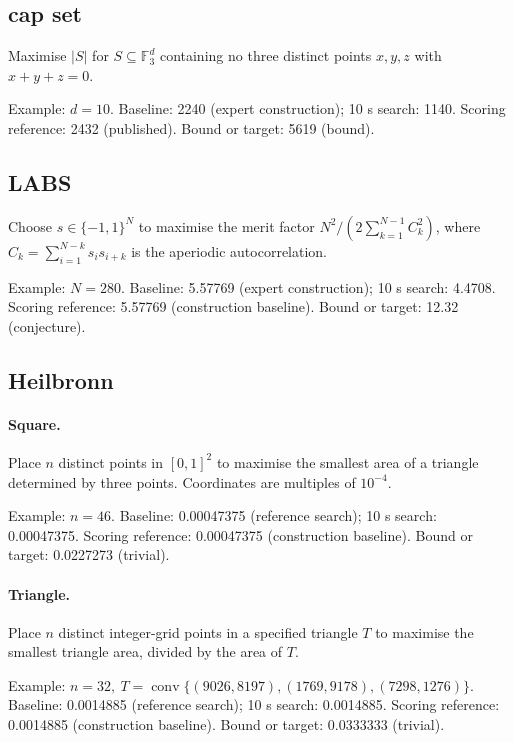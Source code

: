 \subsection{cap set}

Maximise $|S|$ for $S\subseteq\mathbb F_3^d$ containing no three distinct points $x,y,z$ with $x+y+z=0$.

Example: $d=10$. Baseline: 2240 (expert construction); 10 s search: 1140. Scoring reference: 2432 (published). Bound or target: 5619 (bound).

\subsection{LABS}

Choose $s\in\{-1,1\}^N$ to maximise the merit factor $N^2/(2\sum_{k=1}^{N-1}C_k^2)$, where $C_k=\sum_{i=1}^{N-k}s_i s_{i+k}$ is the aperiodic autocorrelation.

Example: $N=280$. Baseline: 5.57769 (expert construction); 10 s search: 4.4708. Scoring reference: 5.57769 (construction baseline). Bound or target: 12.32 (conjecture).

\subsection{Heilbronn}

\paragraph{Square.} Place $n$ distinct points in $[0,1]^2$ to maximise the smallest area of a triangle determined by three points. Coordinates are multiples of $10^{-4}$.

Example: $n=46$. Baseline: 0.00047375 (reference search); 10 s search: 0.00047375. Scoring reference: 0.00047375 (construction baseline). Bound or target: 0.0227273 (trivial).

\paragraph{Triangle.} Place $n$ distinct integer-grid points in a specified triangle $T$ to maximise the smallest triangle area, divided by the area of $T$.

Example: $n=32,\ T=\operatorname{conv}\{(9026,8197),(1769,9178),(7298,1276)\}$. Baseline: 0.0014885 (reference search); 10 s search: 0.0014885. Scoring reference: 0.0014885 (construction baseline). Bound or target: 0.0333333 (trivial).

